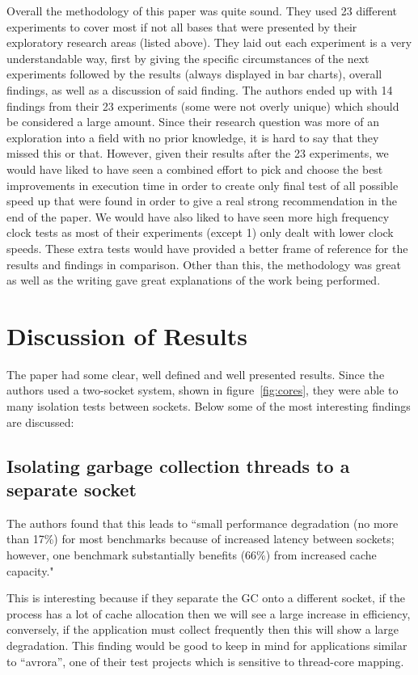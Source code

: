\documentclass[conference]{IEEEtran}
\begin{document}
Overall the methodology of this paper was quite sound. They used 23 different experiments to
cover most if not all bases that were presented by their exploratory research areas (listed above).
They laid out each experiment is a very understandable way, first by giving the specific circumstances
of the next experiments followed by the results (always displayed in bar charts), overall findings, as
well as a discussion of said finding. The authors ended up with 14 findings from their 23 experiments
(some were not overly unique) which should be considered a large amount. Since their research question
was more of an exploration into a field with no prior knowledge, it is hard to say that they missed
this or that. However, given their results after the 23 experiments, we would have liked to have seen
a combined effort to pick and choose the best improvements in execution time in order to create
only final test of all possible speed up that were found in order to give a real strong recommendation
in the end of the paper. We would have also liked to have seen more high frequency clock tests as most
of their experiments (except 1) only dealt with lower clock speeds. These extra tests would have 
provided a better frame of reference for the results and findings in comparison.
Other than this, the methodology was great as well as the writing gave great
explanations of the work being performed.


\section{Discussion of Results}
The paper had some clear, well defined and well presented results.  Since the authors used a two-socket system, shown in figure~\ref{fig:cores}, they were able to many isolation tests between sockets.  Below some of the most interesting findings are discussed: \\  %

\subsection{Isolating garbage collection threads to a separate socket}
 
The authors found that this leads to ``small performance degradation (no more than 17\%) for most benchmarks because of increased latency between sockets; however, one benchmark substantially benefits (66\%) from increased cache capacity."

This is interesting because if they separate the GC onto a different socket, if the process has a lot of cache allocation then we will see a large increase in efficiency, conversely, if the application must collect frequently then this will show a large degradation.  This finding would be good to keep in mind for applications similar to ``avrora'', one of their test projects which is sensitive to thread-core mapping.
\end{document}
